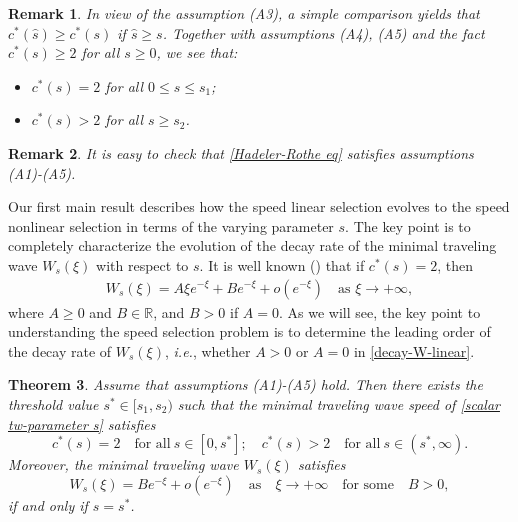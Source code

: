\documentclass[11pt,a4paper]{article}
\newtheorem{theorem}{\textbf{Theorem}}[section]
\newtheorem{remark}[theorem]{\textbf{Remark}}
\numberwithin{equation}{section}
\numberwithin{figure}{section}
\newcommand{\red}[1]{{\color{red}#1}}
\newcommand\bea{\begin{eqnarray}}
\newcommand\eea{\end{eqnarray}}
\begin{document}
\begin{remark}\label{rk:a4+a5}
In view of the assumption (A3), a simple comparison yields that $c^*(\hat{s})\geq c^*(s)$ if $\hat{s}\geq s$.
Together with assumptions (A4), (A5) and the fact $c^*(s)\geq 2$ for all $s\geq0$, we see that:
\begin{itemize}
\item[(1)] $c^*(s)=2$ for all $0\leq s\leq s_1$;
\item[(2)] $c^*(s)>2$ for all $s\geq s_2$.
\end{itemize}
\end{remark}


\begin{remark}
It is easy to check that \eqref{Hadeler-Rothe eq} satisfies assumptions  (A1)-(A5).
\end{remark}




Our first main result describes how the speed linear selection
evolves to the speed nonlinear selection in terms of the varying parameter $s$.
The key point is to completely characterize the evolution of the decay rate of the minimal traveling wave $W_s(\xi)$ with respect to $s$.
It is well known (\cite{Aronson Weinberger}) that if $c^*(s)=2$, then
\bea\label{decay-W-linear}
W_s(\xi)=A\xi e^{-\xi}+Be^{-\xi}+o(e^{-\xi})\quad \mbox{as $\xi\to+\infty$},
\eea
where %
$A\geq0$ and $B\in \mathbb{R}$,
and $B>0$ if $A=0$. 
As we will see, the key point to understanding the speed selection problem is to determine the leading order of the decay rate of $W_s(\xi)$, {\it i.e.},
whether $A>0$ or $A=0$ in \eqref{decay-W-linear}.



\begin{theorem}\label{th: threshold scalar equation}
Assume that assumptions (A1)-(A5) hold. Then there exists the threshold value $s^*\in[s_1,s_2)$ such that the minimal traveling wave speed of \eqref{scalar tw-parameter s} satisfies
\begin{equation}\label{def of threshold scalar}
c^*(s)=2\quad\text{for all}\ s\in[0,s^*];\quad c^*(s)>2\quad\text{for all}\ s\in(s^*,\infty).
\end{equation}
Moreover,
the minimal traveling wave $W_s(\xi)$ satisfies %
\begin{equation}\label{asy tw threshold scalar}
W_s(\xi)=Be^{-\xi}+o(e^{-\xi})\quad \mbox{as}\quad \xi\to+\infty\quad\text{for some}\quad B>0,
\end{equation}
if and only if $s=s^*$.
\end{theorem}
\end{document}
